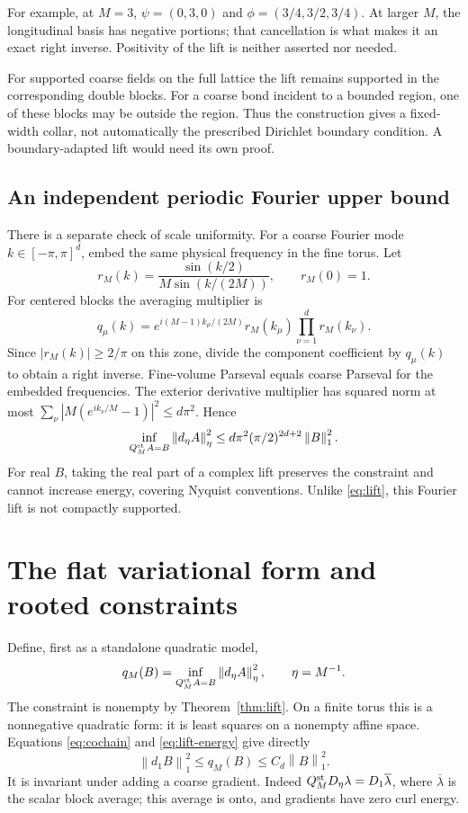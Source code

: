 \documentclass[11pt]{article}
\theoremstyle{remark}
\newcommand{\norm}[1]{\left\|#1\right\|}
\begin{document}
For example, at $M=3$, $\psi=(0,3,0)$ and
$\phi=(3/4,3/2,3/4)$. At larger $M$, the longitudinal basis has
negative portions; that cancellation is what makes it an exact
right inverse. Positivity of the lift is neither asserted nor needed.

For supported coarse fields on the full lattice the lift remains
supported in the corresponding double blocks. For a coarse bond
incident to a bounded region, one of these blocks may be outside
the region. Thus the construction gives a fixed-width collar, not
automatically the prescribed Dirichlet boundary condition. A
boundary-adapted lift would need its own proof.

\subsection{An independent periodic Fourier upper bound}

There is a separate check of scale uniformity. For a coarse Fourier
mode $k\in[-\pi,\pi]^d$, embed the same physical frequency in the
fine torus. Let
\[
 r_M(k)=\frac{\sin(k/2)}{M\sin(k/(2M))},\qquad r_M(0)=1.
\]
For centered blocks the averaging multiplier is
\[
 q_\mu(k)=e^{i(M-1)k_\mu/(2M)}r_M(k_\mu)
                              \prod_{\nu=1}^d r_M(k_\nu).
\]
Since $|r_M(k)|\ge2/\pi$ on this zone, divide the component
coefficient by $q_\mu(k)$ to obtain a right inverse. Fine-volume
Parseval equals coarse Parseval for the embedded frequencies. The
exterior derivative multiplier has squared norm at most
$\sum_\nu|M(e^{ik_\nu/M}-1)|^2\le d\pi^2$. Hence
\[
 \inf_{Q_M^{\rm st}A=B}\norm{d_\eta A}_\eta^2
 \le d\pi^2(\pi/2)^{2d+2}\norm B_1^2.
\]
For real $B$, taking the real part of a complex lift preserves the
constraint and cannot increase energy, covering Nyquist conventions.
Unlike \eqref{eq:lift}, this Fourier lift is not compactly supported.

\section{The flat variational form and rooted constraints}

Define, first as a standalone quadratic model,
\begin{equation}\label{eq:qmin}
 q_M(B)=\inf_{Q_M^{\rm st}A=B}\norm{d_\eta A}_\eta^2,
 \qquad\eta=M^{-1}.
\end{equation}
The constraint is nonempty by Theorem~\ref{thm:lift}. On a finite
torus this is a nonnegative quadratic form: it is least squares
on a nonempty affine space. Equations \eqref{eq:cochain} and
\eqref{eq:lift-energy} give directly
\begin{equation}\label{eq:energy-sandwich}
 \norm{d_1B}_1^2\le q_M(B)\le C_d\norm B_1^2.
\end{equation}
It is invariant under adding a coarse gradient. Indeed
$Q_M^{\rm st}D_\eta\lambda=D_1\overline\lambda$, where
$\overline\lambda$ is the scalar block average; this average is
onto, and gradients have zero curl energy.
\end{document}
